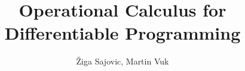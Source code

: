
\title{Operational Calculus for Differentiable Programming}

\author{\v{Z}iga Sajovic, Martin Vuk}



\maketitle









\printbibliography

  
